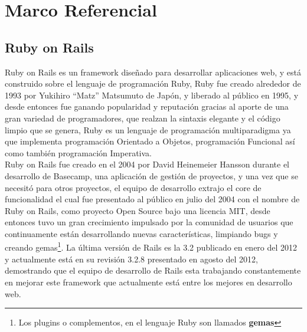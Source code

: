 \chapter{Marco Referencial} %
\label{cha:marco_referncial}

    

  \section{Ruby on Rails} %
  \label{sec:ruby_on_rails}
    Ruby on Rails es un framework dise\~nado para desarrollar aplicaciones web, 
    y está construido sobre el lenguaje de programación Ruby, Ruby  fue creado
    alrededor de 1993 por Yukihiro ``Matz'' Matsumuto de Jap\'on, y liberado al 
    público en 1995, y desde entonces fue ganando  popularidad y 
    reputaci\'on gracias al aporte de una gran variedad de programadores, que 
    realzan la sintaxis elegante y el código limpio que se genera, Ruby es un 
    lenguaje de programación multiparadigma ya que implementa programaci\'on 
    Orientado a Objetos, programaci\'on Funcional así como también 
    programaci\'on Imperativa. \\

    Ruby on Rails fue creado en el 2004 por David Heinemeier Hansson durante el desarrollo de Basecamp, una aplicación de gesti\'on de proyectos, y una vez que se necesitó para otros proyectos, el equipo de desarrollo extrajo el core de funcionalidad el cual fue presentado al público en julio del 2004 con el nombre de Ruby on Rails, como proyecto Open Source bajo una licencia MIT, desde entonces tuvo un gran  crecimiento impulsado por la comunidad de usuarios que continuamente están desarrollando nuevas características, limpiando bugs y creando gemas\footnote{ Los plugins o complementos, en el lenguaje Ruby son llamados \textbf{gemas}}. La última versión de Rails es la 3.2 publicado en enero del 2012 y actualmente está en su revisi\'on 3.2.8 presentado en agosto del 2012,  demostrando que el equipo de desarrollo de Rails esta trabajando constantemente en mejorar este framework que actualmente está entre los mejores en desarrollo web.\\


